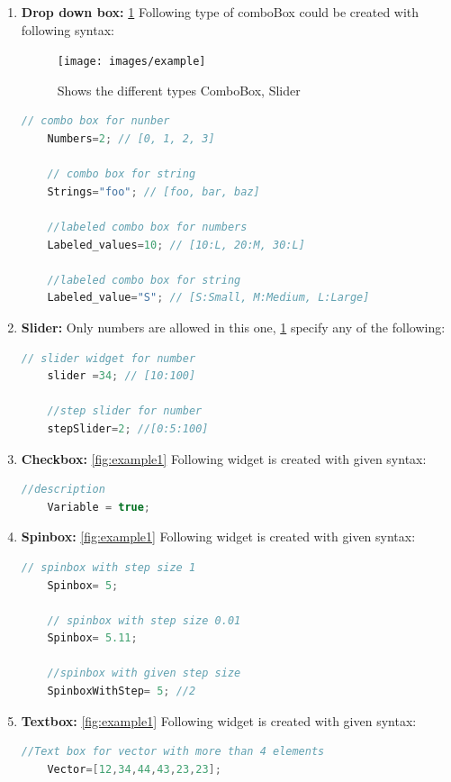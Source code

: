\begin{enumerate}
    \item \textbf{Drop down box:} \ref{fig:example} Following type of comboBox could be created with following syntax:
		\begin{figure}
		\centering
		\texttt{[image: images/example]}
		\caption{Shows the different types ComboBox, Slider}
		\label{fig:example}
		\end{figure}

    \begin{lstlisting}[language=c++]
    // combo box for nunber
    Numbers=2; // [0, 1, 2, 3]
   
    // combo box for string
    Strings="foo"; // [foo, bar, baz]
   
    //labeled combo box for numbers
    Labeled_values=10; // [10:L, 20:M, 30:L]
   
    //labeled combo box for string
    Labeled_value="S"; // [S:Small, M:Medium, L:Large]
    \end{lstlisting}
    \item \textbf{Slider:} Only numbers are allowed in this one, \ref{fig:example} specify any of the following:
    \begin{lstlisting}[language=c++]
    // slider widget for number
    slider =34; // [10:100]
   
    //step slider for number
    stepSlider=2; //[0:5:100]
    \end{lstlisting}
    \item \textbf{Checkbox:} \ref{fig:example1} Following widget is created with given syntax:
    \begin{lstlisting}[language=c++]
    //description
    Variable = true;
    \end{lstlisting}
    \item \textbf{Spinbox:} \ref{fig:example1} Following widget is created with given syntax:
    \begin{lstlisting}[language=c++]
    // spinbox with step size 1
    Spinbox= 5;
    
    // spinbox with step size 0.01
    Spinbox= 5.11;
    
    //spinbox with given step size
	SpinboxWithStep= 5; //2
    \end{lstlisting}
    \item \textbf{Textbox:} \ref{fig:example1} Following widget is created with given syntax:
    \begin{lstlisting}[language=c++]
    //Text box for vector with more than 4 elements
    Vector=[12,34,44,43,23,23];
   

\end{lstlisting}
\end{enumerate}
